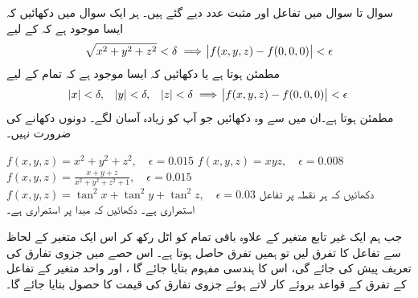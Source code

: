 سوال  تا سوال  میں  تفاعل  اور مثبت عدد  دیے گئے ہیں۔ ہر ایک سوال میں دکھائیں کہ  ایسا  موجود ہے  کہ   کے لیے 
\begin{align*}
\sqrt{x^2+y^2+z^2}<\delta\implies \abs{f(x,y,z)-f(0,0,0)}<\epsilon
\end{align*}
مطمئن ہوتا ہے  یا دکھائیں کہ ایسا  موجود ہے کہ تمام  کے لیے
\begin{align*}
\abs{x}<\delta,\quad \abs{y}<\delta,\quad \abs{z}<\delta  \implies \abs{f(x,y,z)-f(0,0,0)}<\epsilon
\end{align*}
مطمئن ہوتا ہے۔ان میں سے وہ دکھائیں  جو آپ کو زیادہ  آسان لگے۔ دونوں دکھانے کی ضرورت نہیں۔ 

$f(x,y,z)=x^2+y^2+z^2,\quad \epsilon=0.015$
$f(x,y,z)=xyz,\quad \epsilon=0.008$
$f(x,y,z)=\frac{x+y+z}{x^2+y^2+z^2+1},\quad \epsilon=0.015$
$f(x,y,z)=\tan^2x+\tan^2y+\tan^2z,\quad \epsilon=0.03$
دکھائیں کہ ہر نقطہ   پر تفاعل  استمراری ہے۔ 
دکھائیں کہ مبدا پر  استمراری ہے۔



جب ہم    ایک غیر تابع متغیر  کے علاوہ باقی تمام کو اٹل  رکھ کر اس ایک متغیر کے لحاظ سے تفاعل کا تفرق لیں تو ہمیں  تفرق حاصل ہوتا ہے۔ اس حصے  میں  جزوی تفارق  کی تعریف پیش کی جائے گی، اس  کا ہندسی    مفہوم  بتایا جائے گا ، اور واحد متغیر کے تفاعل کے تفرق کے قواعد بروئے کار لاتے ہوئے   جزوی تفارق    کی قیمت کا حصول بتایا جائے گا۔

